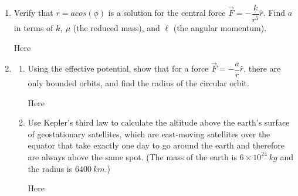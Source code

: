 \documentclass[fleqn]{article}
\begin{document}
\begin{enumerate}
    \item Verify that $r=a cos(\phi)$ is a solution for the central force 
    $\overrightarrow{F}=-\dfrac{k}{r^5} \hat{r}$. Find $a$ in terms of $k, ~ \mu$ 
    (the reduced mass), and $\ell$ (the angular momentum).

    \textcolor{hwColor}{
      Here
    }


    \item \begin{enumerate}
      \item Using the effective potential, show that for a force $\overrightarrow{F}=-\dfrac{a}{r} \hat{r}$,
      there are only bounded orbits, and find the radius of the circular orbit.

        \textcolor{hwColor}{
          Here
        }

      \item Use Kepler’s third law to calculate the altitude above the earth’s
      surface of geostationary satellites, which are east-moving satellites
      over the equator that take exactly one day to go around the earth
      and therefore are always above the same spot. (The mass of the
      earth is $6 \times 10^{24} ~ kg$ and the radius is $6400 ~ km$.)

        \textcolor{hwColor}{
          Here
        }


    \end{enumerate}

  \end{enumerate}
\end{document}
